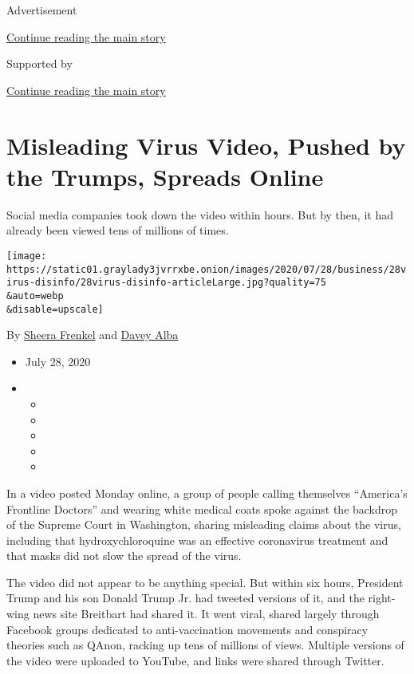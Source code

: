 Advertisement

\protect\hyperlink{after-top}{Continue reading the main story}

Supported by

\protect\hyperlink{after-sponsor}{Continue reading the main story}

\hypertarget{misleading-virus-video-pushed-by-the-trumps-spreads-online}{%
\section{Misleading Virus Video, Pushed by the Trumps, Spreads
Online}\label{misleading-virus-video-pushed-by-the-trumps-spreads-online}}

Social media companies took down the video within hours. But by then, it
had already been viewed tens of millions of times.

\texttt{[image: https://static01.graylady3jvrrxbe.onion/images/2020/07/28/business/28virus-disinfo/28virus-disinfo-articleLarge.jpg?quality=75\\\&auto=webp\\\&disable=upscale]}

By \href{https://www.nytimes3xbfgragh.onion/by/sheera-frenkel}{Sheera
Frenkel} and
\href{https://www.nytimes3xbfgragh.onion/by/davey-alba}{Davey Alba}

\begin{itemize}
\item
  July 28, 2020
\item
  \begin{itemize}
  \item
  \item
  \item
  \item
  \item
  \end{itemize}
\end{itemize}

In a video posted Monday online, a group of people calling themselves
``America's Frontline Doctors'' and wearing white medical coats spoke
against the backdrop of the Supreme Court in Washington, sharing
misleading claims about the virus, including that hydroxychloroquine was
an effective coronavirus treatment and that masks did not slow the
spread of the virus.

The video did not appear to be anything special. But within six hours,
President Trump and his son Donald Trump Jr. had tweeted versions of it,
and the right-wing news site Breitbart had shared it. It went viral,
shared largely through Facebook groups dedicated to anti-vaccination
movements and conspiracy theories such as QAnon, racking up tens of
millions of views. Multiple versions of the video were uploaded to
YouTube, and links were shared through Twitter.

